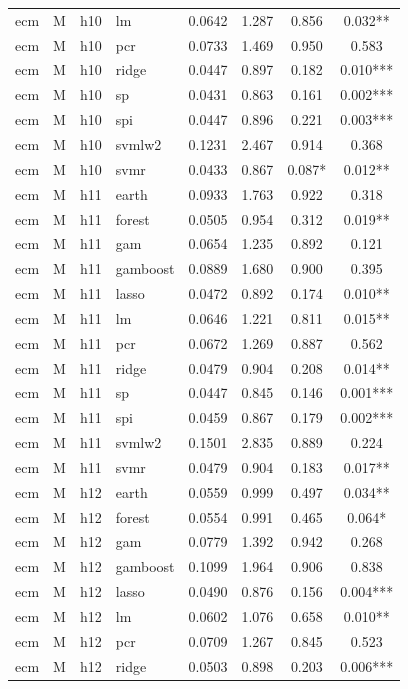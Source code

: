 \begin{ThreePartTable}
\begin{longtable}[t]{llclcccc}
ecm & M & h10 & lm & 0.0642 & 1.287 & 0.856 & 0.032**\\
ecm & M & h10 & pcr & 0.0733 & 1.469 & 0.950 & 0.583\\
ecm & M & h10 & ridge & 0.0447 & 0.897 & 0.182 & 0.010***\\
ecm & M & h10 & sp & 0.0431 & 0.863 & 0.161 & 0.002***\\
ecm & M & h10 & spi & 0.0447 & 0.896 & 0.221 & 0.003***\\
ecm & M & h10 & svmlw2 & 0.1231 & 2.467 & 0.914 & 0.368\\
ecm & M & h10 & svmr & 0.0433 & 0.867 & 0.087* & 0.012**\\
\addlinespace
ecm & M & h11 & earth & 0.0933 & 1.763 & 0.922 & 0.318\\
ecm & M & h11 & forest & 0.0505 & 0.954 & 0.312 & 0.019**\\
ecm & M & h11 & gam & 0.0654 & 1.235 & 0.892 & 0.121\\
ecm & M & h11 & gamboost & 0.0889 & 1.680 & 0.900 & 0.395\\
ecm & M & h11 & lasso & 0.0472 & 0.892 & 0.174 & 0.010**\\
ecm & M & h11 & lm & 0.0646 & 1.221 & 0.811 & 0.015**\\
ecm & M & h11 & pcr & 0.0672 & 1.269 & 0.887 & 0.562\\
ecm & M & h11 & ridge & 0.0479 & 0.904 & 0.208 & 0.014**\\
ecm & M & h11 & sp & 0.0447 & 0.845 & 0.146 & 0.001***\\
ecm & M & h11 & spi & 0.0459 & 0.867 & 0.179 & 0.002***\\
ecm & M & h11 & svmlw2 & 0.1501 & 2.835 & 0.889 & 0.224\\
ecm & M & h11 & svmr & 0.0479 & 0.904 & 0.183 & 0.017**\\
\addlinespace
ecm & M & h12 & earth & 0.0559 & 0.999 & 0.497 & 0.034**\\
ecm & M & h12 & forest & 0.0554 & 0.991 & 0.465 & 0.064*\\
ecm & M & h12 & gam & 0.0779 & 1.392 & 0.942 & 0.268\\
ecm & M & h12 & gamboost & 0.1099 & 1.964 & 0.906 & 0.838\\
ecm & M & h12 & lasso & 0.0490 & 0.876 & 0.156 & 0.004***\\
ecm & M & h12 & lm & 0.0602 & 1.076 & 0.658 & 0.010**\\
ecm & M & h12 & pcr & 0.0709 & 1.267 & 0.845 & 0.523\\
ecm & M & h12 & ridge & 0.0503 & 0.898 & 0.203 & 0.006***\\

\end{longtable}
\end{ThreePartTable}
